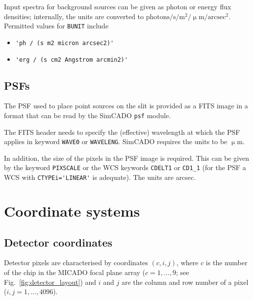\documentclass[a4paper,twoside,11pt]{article}
\newcommand{\micron}{\upmu\mathrm{m}}
\begin{document}
Input spectra for background sources can be given as photon or energy
flux densities; internally, the units are converted to
$\mathrm{photons}/\mathrm{s}/\mathrm{m^{2}}/\micron/\mathrm{arcsec^{2}}$. Permitted
values for \lstinline{BUNIT} include
\begin{itemize}
\item \lstinline{'ph / (s m2 micron arcsec2)'}
\item \lstinline{'erg / (s cm2 Angstrom arcmin2)'}
\end{itemize}

\subsection{PSFs}
\label{ssec:input_psf}

The PSF used to place point sources on the slit is provided as a FITS
image in a format that can be read by the SimCADO \lstinline{psf}
module.

The FITS header needs to specify the (effective) wavelength at which
the PSF applies in keyword \lstinline{WAVE0} or
\lstinline{WAVELENG}. SimCADO requires the units to be $\micron$.

In addition, the size of the pixels in the PSF image is required. This
can be given by the keyword \lstinline{PIXSCALE} or the WCS keywords
\lstinline{CDELT1} or \lstinline{CD1_1} (for the PSF a WCS with
\lstinline{CTYPEi='LINEAR'} is adequate). The units are arcsec.


\section{Coordinate systems}
\label{sec:coordinates}

\subsection{Detector coordinates}

Detector pixels are characterised by coordinates $(c, i, j)$, where
$c$ is the number of the chip in the MICADO focal plane array
($c=1,\dots,9$; see Fig.~\ref{fig:detector_layout}) and $i$ and $j$
are the column and row number of a pixel ($i, j = 1,\dots,4096$).
\end{document}
